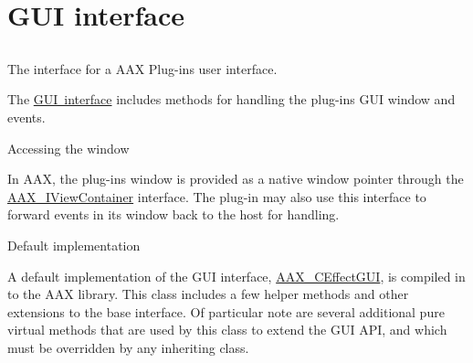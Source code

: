 \hypertarget{a00799}{}\section{G\+UI interface}
\label{a00799}


\subsection{ }
The interface for a A\+AX Plug-\/in\textquotesingle{}s user interface. 

The \mbox{\hyperlink{a01821}{G\+UI interface}} includes methods for handling the plug-\/in\textquotesingle{}s G\+UI window and events.

\begin{DoxyParagraph}{Accessing the window}

\end{DoxyParagraph}
In A\+AX, the plug-\/in\textquotesingle{}s window is provided as a native window pointer through the \mbox{\hyperlink{a01889}{A\+A\+X\+\_\+\+I\+View\+Container}} interface. The plug-\/in may also use this interface to forward events in its window back to the host for handling.

\begin{DoxyParagraph}{Default implementation}

\end{DoxyParagraph}
A default implementation of the G\+UI interface, \mbox{\hyperlink{a01477}{A\+A\+X\+\_\+\+C\+Effect\+G\+UI}}, is compiled in to the A\+AX library. This class includes a few helper methods and other extensions to the base interface. Of particular note are several additional pure virtual methods that are used by this class to extend the G\+UI A\+PI, and which must be overridden by any inheriting class.

